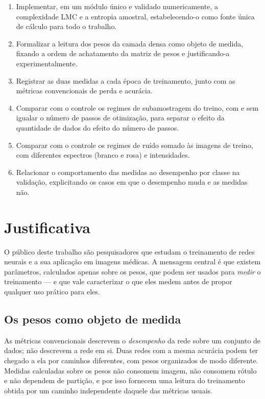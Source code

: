 \begin{enumerate}
    \item Implementar, em um módulo único e validado numericamente, a
          complexidade LMC e a entropia amostral, estabelecendo-o como fonte
          única de cálculo para todo o trabalho.
    \item Formalizar a leitura dos pesos da camada densa como objeto de
          medida, fixando a ordem de achatamento da matriz de pesos e
          justificando-a experimentalmente.
    \item Registrar as duas medidas a cada época de treinamento, junto com as
          métricas convencionais de perda e acurácia.
    \item Comparar com o controle os regimes de subamostragem do treino, com e
          sem igualar o número de passos de otimização, para separar o efeito
          da quantidade de dados do efeito do número de passos.
    \item Comparar com o controle os regimes de ruído somado às imagens de
          treino, com diferentes espectros (branco e rosa) e intensidades.
    \item Relacionar o comportamento das medidas ao desempenho por classe na
          validação, explicitando os casos em que o desempenho muda e as
          medidas não.
\end{enumerate}

\section{Justificativa}
\label{sec:P-justificativa}

O público deste trabalho são pesquisadores que estudam o treinamento de redes
neurais e a sua aplicação em imagens médicas. A mensagem central é que existem
parâmetros, calculados apenas sobre os pesos, que podem ser usados para
\emph{medir} o treinamento --- e que vale caracterizar o que eles medem antes
de propor qualquer uso prático para eles.

\subsection{Os pesos como objeto de medida}

As métricas convencionais descrevem o \emph{desempenho} da rede sobre um
conjunto de dados; não descrevem a rede em si. Duas redes com a mesma acurácia
podem ter chegado a ela por caminhos diferentes, com pesos organizados de modo
diferente. Medidas calculadas sobre os pesos não consomem imagem, não consomem
rótulo e não dependem de partição, e por isso fornecem uma leitura do
treinamento obtida por um caminho independente daquele das métricas usuais.

